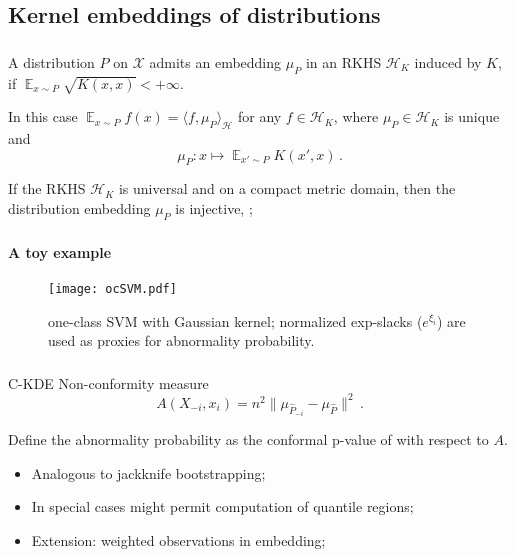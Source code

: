 \documentclass[t]{beamer}  %
\newcommand{\Xcal}{\mathcal{X}}
\newcommand{\Hcal}{\mathcal{H}}
\newcommand{\ex}{\mathop{\mathbb{E}}\nolimits}
\begin{document}
\subsection{Kernel embeddings of distributions} %
\label{sub:kernel_embeddings_of_distributions}

\begin{frame}[c]\frametitle{\insertsection}
  \framesubtitle{\insertsubsection}
  A distribution $P$ on $\Xcal$ admits an embedding $\mu_P$ in an RKHS $\Hcal_K$
  induced by $K$, if $\ex_{x\sim P} \sqrt{K(x,x)} < +\infty$.
  
  \vspace{\baselineskip}
  In this case $\ex_{x\sim P} f(x) = \langle f, \mu_P \rangle_\Hcal$ for any
  $f\in \Hcal_K$, where $\mu_P\in \Hcal_K$ is unique and
  $$ \mu_P: x \mapsto \ex_{x'\sim P} K(x', x) \,. $$
  
  \vspace{\baselineskip}
  If the RKHS $\Hcal_K$ is universal and on a compact metric domain, then the
  distribution embedding $\mu_P$ is injective, \cite{gretton2012};
\end{frame}

\begin{frame}[c]\frametitle{\insertsection}
  \framesubtitle{A toy example}
  \begin{figure}%
    \centering
    \texttt{[image: ocSVM.pdf]}
    \caption{one-class SVM with Gaussian kernel; normalized exp-slacks ($e^{\xi_i}$)
    are used as proxies for abnormality probability.}
    \label{fig:ocsvm}
  \end{figure}
\end{frame}

\begin{frame}[c]\frametitle{\insertsection}
  \framesubtitle{\insertsubsection}
  \begin{block}{C-KDE}
    Non-conformity measure
    $$ A(X_{-i}, x_i) = n^2 \| \mu_{\hat{P}_{-i}} - \mu_{\hat{P}} \|^2 \,. $$

    Define the abnormality probability as the conformal p-value of with respect
    to $A$.

    \begin{itemize}
      \item Analogous to jackknife bootstrapping;
      \item In special cases might permit computation of quantile regions;
      \item Extension: weighted observations in embedding;
    \end{itemize}
  \end{block}
\end{frame}
\end{document}
